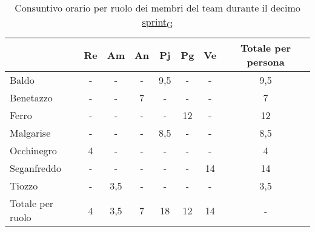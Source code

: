 \begin{table}[!h]
    \centering
    \begin{tabular}{ | l | c | c | c | c | c | c | c | }
        \hline
        \textbf{} & \textbf{Re} & \textbf{Am} &\textbf{An} & \textbf{Pj} & \textbf{Pg} & \textbf{Ve} & \textbf{Totale per persona} \\
        \hline
        Baldo            &  -   &  -   &  -   &  9,5 &  -   &  -   &  9,5 \\
        Benetazzo        &  -   &  -   &  7   &  -   &  -   &  -   &  7   \\
        Ferro            &  -   &  -   &  -   &  -   & 12   &  -   & 12   \\
        Malgarise        &  -   &  -   &  -   &  8,5 &  -   &  -   &  8,5 \\
        Occhinegro       &  4   &  -   &  -   &  -   &  -   &  -   &  4   \\
        Seganfreddo      &  -   &  -   &  -   &  -   &  -   & 14   & 14   \\
        Tiozzo           &  -   &  3,5 &  -   &  -   &  -   &  -   &  3,5 \\
        \hline
        Totale per ruolo &  4   &  3,5 &  7   & 18   & 12   & 14   &  -   \\
        \hline
    \end{tabular}
    \caption{Consuntivo orario per ruolo dei membri del team durante il decimo \href{https://7last.github.io/docs/pb/documentazione-interna/glossario\#sprint}{sprint\textsubscript{G}}}
\end{table}

